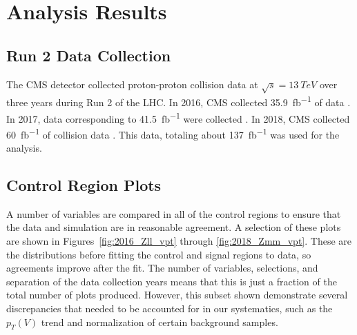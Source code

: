 \chapter{Analysis Results} \label{ch:results}

\section{Run 2 Data Collection}

The CMS detector collected proton-proton collision data at $\sqrt{s} = \SI{13}{TeV}$
over three years during Run 2 of the LHC.
In 2016, CMS collected \SI{35.9}{fb^{-1}} of data \cite{CMS-PAS-LUM-17-001}.
In 2017, data corresponding to \SI{41.5}{fb^{-1}} were collected \cite{CMS-PAS-LUM-17-004}.
In 2018, CMS collected \SI{60}{fb^{-1}} of collision data \cite{CMS-PAS-LUM-18-002}.
This data, totaling about \SI{137}{fb^{-1}} was used for the analysis.

\section{Control Region Plots}

A number of variables are compared in all of the control regions
to ensure that the data and simulation are in reasonable agreement.
A selection of these plots are shown in Figures~\ref{fig:2016_Zll_vpt} through \ref{fig:2018_Zmm_vpt}.
These are the distributions before fitting the control and signal regions to data,
so agreements improve after the fit.
The number of variables, selections, and separation of the data collection years
means that this is just a fraction of the total number of plots produced.
However, this subset shown demonstrate several discrepancies that needed to be accounted for in our systematics,
such as the $p_T(V)$ trend and normalization of certain background samples.

